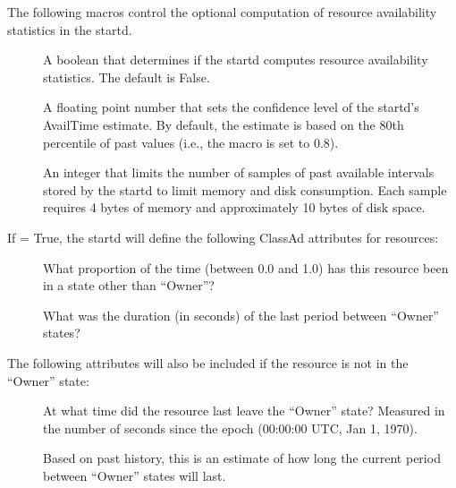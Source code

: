 The following macros control the optional computation of resource
availability statistics in the startd.

\begin{description}

\item[]
\label{param:StartdComputeAvailStats}
  A boolean that determines if the startd computes resource
  availability statistics.  The default is False.

\item[]
\label{param:StartdAvailConfidence}
  A floating point number that sets the confidence level of the
  startd's AvailTime estimate.  By default, the estimate is based on
  the 80th percentile of past values (i.e., the macro is set to 0.8).

\item[]
\label{param:StartdMaxAvailPeriodSamples}
  An integer that limits the number of samples of past available
  intervals stored by the startd to limit memory and disk consumption.
  Each sample requires 4 bytes of memory and approximately 10 bytes of
  disk space.

\end{description}

If  = True, the startd will
define the following ClassAd attributes for resources:

\begin{description}
\item[]
  What proportion of the time (between 0.0 and 1.0)
  has this resource been in a state other than ``Owner''?
\item[]
  What was the duration (in seconds) of the
  last period between ``Owner'' states?
\end{description}

The following attributes will also be included if the resource is
not in the ``Owner'' state:

\begin{description}
\item[]
  At what time did the resource last leave the
  ``Owner'' state?  Measured in the number of seconds since the
  epoch (00:00:00 UTC, Jan 1, 1970).
\item[]
  Based on past history, this is an estimate
  of how long the current period between ``Owner'' states will
  last.
\end{description}


